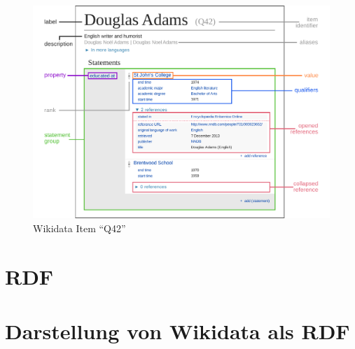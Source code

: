 \begin{figure}
  \includegraphics[width=\linewidth]{pics/Datamodel_in_Wikidata}
  \caption{Wikidata Item ``Q42''}
  \label{fig:wd-datamodel}
\end{figure}

\section{RDF}

\section{Darstellung von Wikidata als RDF}